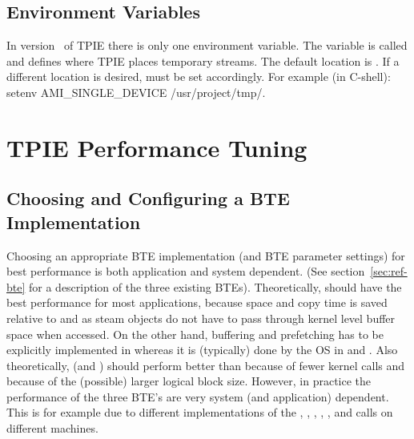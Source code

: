\subsection{Environment Variables}

In version \version~of TPIE there is only one environment
variable. The variable is called
 and defines where TPIE places
temporary streams. The default location is
. If a different location is desired,
 must be set accordingly. For
example (in C-shell): setenv AMI\_SINGLE\_DEVICE
/usr/project/tmp/.  


\section{TPIE Performance Tuning}

\subsection{Choosing and Configuring a BTE Implementation}


Choosing an appropriate BTE implementation (and BTE
parameter settings) for best performance is both application
and system dependent. (See section~\ref{sec:ref-bte} for a
description of the three existing BTEs). Theoretically,
 should have the best performance for most
applications, because space and copy time is saved relative
to  and  as steam
objects do not have to pass through kernel level buffer
space when accessed. On the other hand, buffering and
prefetching has to be explicitly implemented in
 whereas it is (typically) done by the OS
in  and .  Also
theoretically,  (and )
should perform better than  because of
fewer kernel calls and because of the (possible) larger
logical block size.  However, in practice the performance of
the three BTE's are very system (and application) dependent.
This is for example due to different implementations of the
, , ,
, , and 
calls on different machines.

